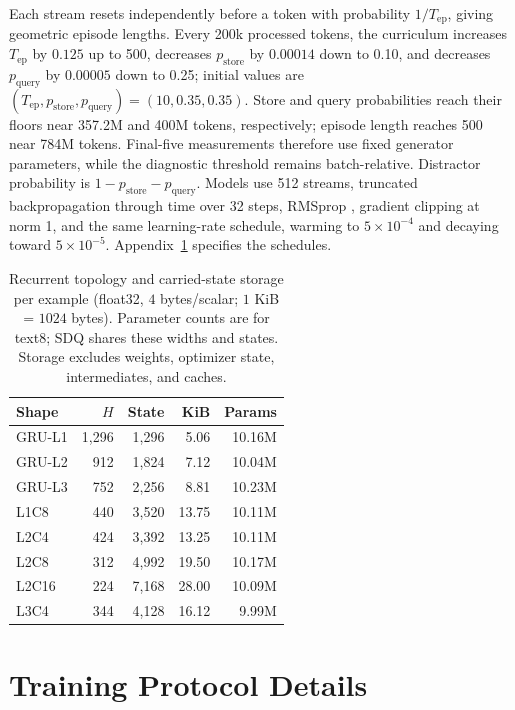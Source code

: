 \documentclass[letterpaper,twoside]{article}
\begin{document}
Each stream resets independently before a token with probability $1/T_{\mathrm{ep}}$, giving geometric episode lengths. Every 200k processed tokens, the curriculum increases $T_{\mathrm{ep}}$ by $0.125$ up to 500, decreases $p_{\mathrm{store}}$ by $0.00014$ down to 0.10, and decreases $p_{\mathrm{query}}$ by $0.00005$ down to 0.25; initial values are $(T_{\mathrm{ep}},p_{\mathrm{store}},p_{\mathrm{query}})=(10,0.35,0.35)$. Store and query probabilities reach their floors near 357.2M and 400M tokens, respectively; episode length reaches 500 near 784M tokens. Final-five measurements therefore use fixed generator parameters, while the diagnostic threshold remains batch-relative. Distractor probability is $1-p_{\mathrm{store}}-p_{\mathrm{query}}$. Models use 512 streams, truncated backpropagation through time over 32 steps, RMSprop \citep{tieleman2012rmsprop}, gradient clipping at norm 1, and the same learning-rate schedule, warming to $5\times10^{-4}$ and decaying toward $5\times10^{-5}$. Appendix~\ref{app:protocol} specifies the schedules.


\begin{table}[t]
\centering
\caption{Recurrent topology and carried-state storage per example (float32, $4$ bytes/scalar; $1$ KiB = $1024$ bytes). Parameter counts are for text8; SDQ shares these widths and states. Storage excludes weights, optimizer state, intermediates, and caches.}
\label{tab:topology}
\small
\begin{tabular}{lrrrr}
\toprule
Shape & $H$ & State & KiB & Params \\
\midrule
GRU-L1 & 1,296 & 1,296 & 5.06 & 10.16M \\
GRU-L2 & 912 & 1,824 & 7.12 & 10.04M \\
GRU-L3 & 752 & 2,256 & 8.81 & 10.23M \\
\midrule
L1C8 & 440 & 3,520 & 13.75 & 10.11M \\
L2C4 & 424 & 3,392 & 13.25 & 10.11M \\
L2C8 & 312 & 4,992 & 19.50 & 10.17M \\
L2C16 & 224 & 7,168 & 28.00 & 10.09M \\
L3C4 & 344 & 4,128 & 16.12 & 9.99M \\
\bottomrule
\end{tabular}
\end{table}

\section{Training Protocol Details}\label{app:protocol}
\end{document}
